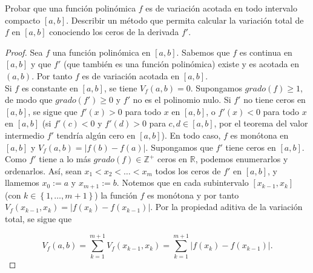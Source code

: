 \setcounter{section}{6}
\setcounter{exercise}{2}
\begin{exercise}

  Probar que una función polinómica $f$ es de variación acotada en todo intervalo compacto $\left[a,b\right]$. Describir un método que permita calcular la variación total de $f$ en $\left[a,b\right]$ conociendo los ceros de la derivada $f'$.

\end{exercise}

\begin{proof}

Sea $f$ una función polinómica en $\left[a,b\right]$. Sabemos que $f$ es continua en $\left[a,b\right]$ y que $f'$ (que también es una función polinómica) existe y es acotada en $\left(a,b\right)$. Por tanto $f$ es de variación acotada en $\left[a,b\right]$.\\
Si $f$ es constante en $\left[a,b\right]$, se tiene $V_f\left(a,b\right)=0$. Supongamos $grado\left(f\right)\geq 1$, de modo que $grado\left(f'\right)\geq 0$ y $f'$ no es el polinomio nulo. Si $f'$ no tiene ceros en $\left[a,b\right]$, se sigue que $f'\left(x\right)>0$ para todo $x$ en $\left[a,b\right]$, o $f'\left(x\right)<0$ para todo $x$ en $\left[a,b\right]$ (si $f'\left(c\right)<0$ y $f'\left(d\right)>0$ para $c,d\in \left[a,b\right]$, por el teorema del valor intermedio $f'$ tendría algún cero en $\left[a,b\right]$). En todo caso, $f$ es monótona en $\left[a,b\right]$ y $V_f\left(a,b\right)=|f\left(b\right)-f\left(a\right)|$. Supongamos que $f'$ tiene ceros en $\left[a,b\right]$. Como $f'$ tiene a lo más $grado\left(f\right)\in \mathds{Z}^{+}$ ceros en $\mathds{R}$, podemos enumerarlos y ordenarlos. Así, sean $x_1<x_2<\dots<x_m$ todos los ceros de $f'$ en $\left[a,b\right]$, y llamemos $x_0:=a$ y $x_{m+1}:=b$. Notemos que en cada subintervalo $\left[x_{k-1},x_k\right]$ (con $k\in \left\lbrace 1,\dots, m+1 \right\rbrace$) la función $f$ es monótona y por tanto $V_f\left(x_{k-1},x_k\right)=|f\left(x_k\right)-f\left(x_{k-1}\right)|$. Por la propiedad aditiva de la variación total, se sigue que

\begin{equation*}
  V_f\left(a,b\right)=\sum_{k=1}^{m+1}V_f\left(x_{k-1},x_k\right)=\sum_{k=1}^{m+1}|f\left(x_k\right)-f\left(x_{k-1}\right)|.
\end{equation*}

\end{proof}
